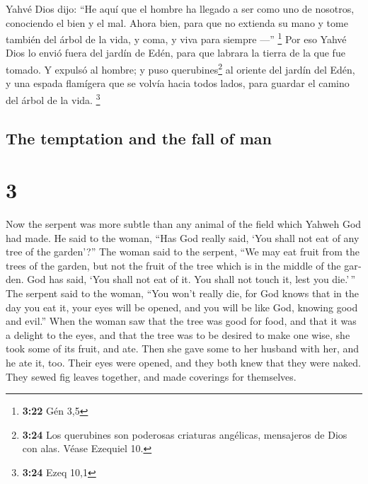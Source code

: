 \begin{paracol}{2}
 Yahvé Dios dijo: ``He aquí que el hombre ha llegado a
ser como uno de nosotros, conociendo el bien y el mal. Ahora bien, para
que no extienda su mano y tome también del árbol de la vida, y coma, y
viva para siempre ---'' \footnote{\textbf{3:22} Gén 3,5} 
Por eso Yahvé Dios lo envió fuera del jardín de Edén, para que labrara
la tierra de la que fue tomado.  Y expulsó al hombre; y
puso querubines\footnote{\textbf{3:24} Los querubines son poderosas
  criaturas angélicas, mensajeros de Dios con alas. Véase Ezequiel 10.}
al oriente del jardín del Edén, y una espada flamígera que se volvía
hacia todos lados, para guardar el camino del árbol de la vida.
\footnote{\textbf{3:24} Ezeq 10,1}

\switchcolumn
\begin{otherlanguage}{english}

\hypertarget{the-temptation-and-the-fall-of-man}{%
\subsection{The temptation and the fall of
man}\label{the-temptation-and-the-fall-of-man}}

\hypertarget{section-5}{%
\section{3}\label{section-5}}

 Now the serpent was more subtle than any animal of the
field which Yahweh God had made. He said to the woman, ``Has God really
said, `You shall not eat of any tree of the garden'?'' 
The woman said to the serpent, ``We may eat fruit from the trees of the
garden,  but not the fruit of the tree which is in the
middle of the garden. God has said, `You shall not eat of it. You shall
not touch it, lest you die.'\,''  The serpent said to the
woman, ``You won't really die,  for God knows that in the
day you eat it, your eyes will be opened, and you will be like God,
knowing good and evil.''  When the woman saw that the tree
was good for food, and that it was a delight to the eyes, and that the
tree was to be desired to make one wise, she took some of its fruit, and
ate. Then she gave some to her husband with her, and he ate it, too.
 Their eyes were opened, and they both knew that they were
naked. They sewed fig leaves together, and made coverings for
themselves.


\end{otherlanguage}
\end{paracol}
